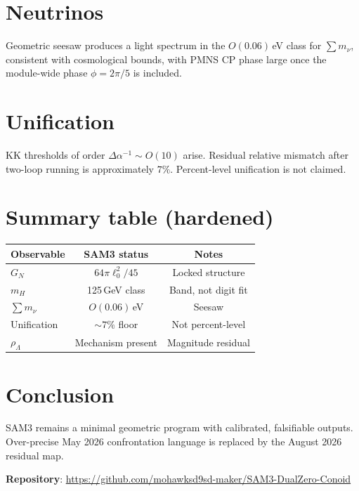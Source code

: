 \documentclass[11pt,a4paper]{article}
\begin{document}
\section{Neutrinos}
Geometric seesaw produces a light spectrum in the $O(0.06)$\,eV class for $\sum m_\nu$, consistent with cosmological bounds, with PMNS CP phase large once the module-wide phase $\phi=2\pi/5$ is included.

\section{Unification}
KK thresholds of order $\Delta\alpha^{-1}\sim O(10)$ arise. Residual relative mismatch after two-loop running is approximately $7\%$. Percent-level unification is not claimed.

\section{Summary table (hardened)}
\begin{table}[ht]
\centering
\begin{tabular}{lcc}
\toprule
Observable & SAM3 status & Notes \\
\midrule
$G_N$ & $64\pi\ell_0^2/45$ & Locked structure \\
$m_H$ & 125\,GeV class & Band, not digit fit \\
$\sum m_\nu$ & $O(0.06)$\,eV & Seesaw \\
Unification & $\sim 7\%$ floor & Not percent-level \\
$\rho_\Lambda$ & Mechanism present & Magnitude residual \\
\bottomrule
\end{tabular}
\end{table}

\section{Conclusion}
SAM3 remains a minimal geometric program with calibrated, falsifiable outputs. Over-precise May 2026 confrontation language is replaced by the August 2026 residual map.

\textbf{Repository}: \url{https://github.com/mohawksd9sd-maker/SAM3-DualZero-Conoid}
\end{document}
